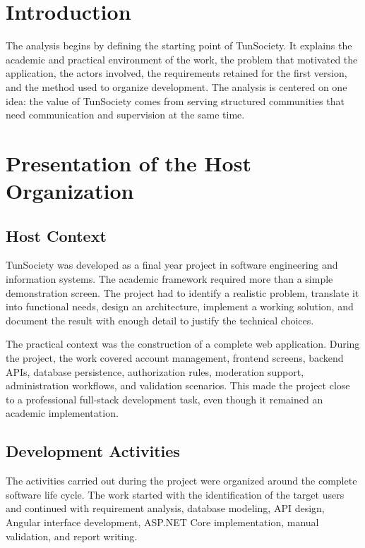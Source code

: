 \section{Introduction}

The analysis begins by defining the starting point of TunSociety. It explains the academic and practical environment of the work, the problem that motivated the application, the actors involved, the requirements retained for the first version, and the method used to organize development. The analysis is centered on one idea: the value of TunSociety comes from serving structured communities that need communication and supervision at the same time.

\section{Presentation of the Host Organization}

\subsection{Host Context}

TunSociety was developed as a final year project in software engineering and information systems. The academic framework required more than a simple demonstration screen. The project had to identify a realistic problem, translate it into functional needs, design an architecture, implement a working solution, and document the result with enough detail to justify the technical choices.

The practical context was the construction of a complete web application. During the project, the work covered account management, frontend screens, backend APIs, database persistence, authorization rules, moderation support, administration workflows, and validation scenarios. This made the project close to a professional full-stack development task, even though it remained an academic implementation.

\subsection{Development Activities}

The activities carried out during the project were organized around the complete software life cycle. The work started with the identification of the target users and continued with requirement analysis, database modeling, API design, Angular interface development, ASP.NET Core implementation, manual validation, and report writing.

